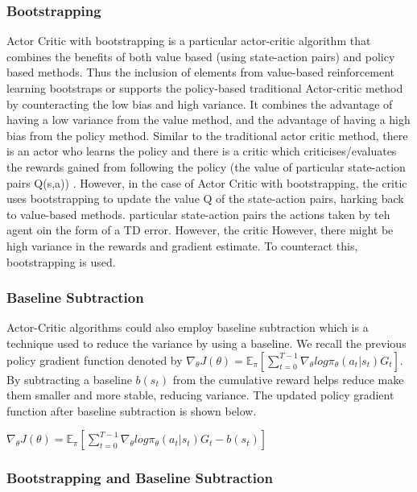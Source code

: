 \documentclass{article}
\begin{document}
\subsubsection{Bootstrapping}
Actor Critic with bootstrapping is a particular actor-critic algorithm that combines the benefits of both value based (using state-action pairs) and policy based methods. Thus the inclusion of elements from value-based reinforcement learning bootstraps or supports the policy-based traditional Actor-critic method by counteracting the low bias and high variance. It combines the advantage of having a low variance from the value method, and the advantage of having a high bias from the policy method.
Similar to the traditional actor critic method, there is an actor who learns the policy and there is a critic which criticises/evaluates the rewards gained from following the policy (the value of particular state-action pairs Q(s,a)) . However, in the case of Actor Critic with bootstrapping, the critic uses bootstrapping to update the value Q of the state-action pairs, harking back to value-based methods. \newline 
particular state-action pairs  the actions taken by teh agent oin the form of a TD error. However, the critic 
However, there might be high variance in the rewards and gradient estimate. To counteract this, bootstrapping is used. 

\subsubsection{Baseline Subtraction}
Actor-Critic algorithms could also employ baseline subtraction which is a technique used to reduce the variance by using a baseline. We recall the previous policy gradient function denoted by $\nabla_\theta J(\theta) = \mathbb{E}_\pi[\sum _{t=0}^{T-1} \nabla_\theta log\pi_\theta (a_t|s_t)G_t]$. By subtracting a baseline $b(s_t)$ from the cumulative reward helps reduce make them smaller and more stable, reducing variance. The updated policy gradient function after baseline subtraction is shown below. 

$\nabla_\theta J(\theta) = \mathbb{E}_\pi[\sum _{t=0}^{T-1} \nabla_\theta log\pi_\theta (a_t|s_t)G_t - b(s_t)]$



\subsubsection{Bootstrapping and Baseline Subtraction}
\end{document}
